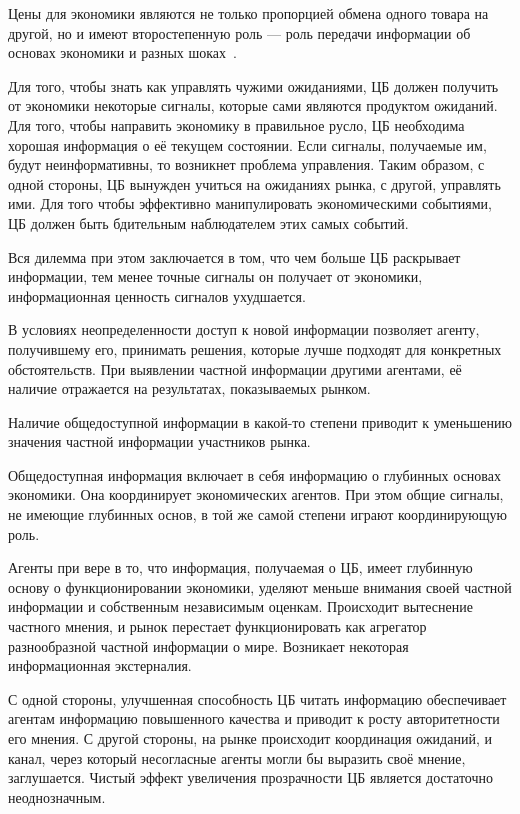 \documentclass[14pt,a4paper, oneside]{extreport}
\begin{document}
Цены для экономики являются не только пропорцией обмена одного товара на другой, но и имеют второстепенную роль --- роль передачи информации об основах экономики и разных шоках~\cite{hayek1945use}.

 Для того, чтобы знать как управлять чужими ожиданиями, ЦБ должен получить от экономики некоторые сигналы, которые сами являются продуктом ожиданий. Для того, чтобы направить экономику в правильное русло, ЦБ необходима хорошая информация о её текущем состоянии. Если сигналы, получаемые им, будут неинформативны, то возникнет проблема управления. Таким образом, с одной стороны, ЦБ вынужден учиться на ожиданиях рынка, с другой, управлять ими. Для того чтобы эффективно манипулировать экономическими событиями, ЦБ должен быть бдительным наблюдателем этих самых событий. 
 
Вся дилемма при этом заключается в том, что чем больше ЦБ раскрывает информации, тем менее точные сигналы он получает от экономики, информационная ценность сигналов ухудшается. 
 
В условиях неопределенности доступ к новой информации позволяет агенту, получившему его, принимать решения, которые лучше подходят для конкретных обстоятельств. При выявлении частной информации другими агентами, её наличие отражается на результатах, показываемых рынком.

Наличие общедоступной информации в какой-то степени приводит к уменьшению значения частной информации участников рынка.

Общедоступная информация включает в себя информацию о глубинных основах экономики. Она координирует экономических агентов. При этом общие сигналы, не имеющие глубинных основ, в той же самой степени играют координирующую роль. 

Агенты при вере в то, что информация, получаемая о ЦБ, имеет глубинную основу о функционировании
экономики, уделяют меньше внимания своей частной информации и собственным независимым оценкам. Происходит вытеснение частного мнения, и рынок перестает функционировать как агрегатор разнообразной частной информации о мире. Возникает некоторая информационная экстерналия. 

С одной стороны, улучшенная способность ЦБ читать информацию обеспечивает агентам информацию повышенного качества и приводит к росту авторитетности его мнения. С другой стороны, на рынке происходит координация ожиданий, и канал, через который несогласные агенты могли бы выразить своё мнение, заглушается. Чистый эффект увеличения прозрачности ЦБ является достаточно неоднозначным. 
\end{document}
